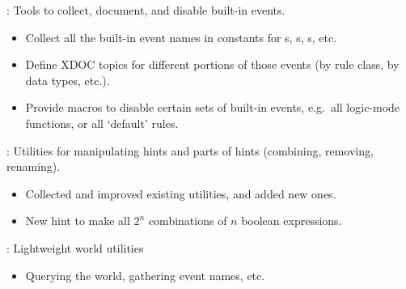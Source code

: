 
\begin{frame}

\newlibtitle

:
Tools to collect, document, and disable built-in events.
\begin{itemize}
\item Collect all the built-in event names in constants for
      s, s, s, etc.
\item Define XDOC topics for different portions of those events
      (by rule class, by data types, etc.).
\item Provide macros to disable certain sets of built-in events,
      e.g.\ all logic-mode functions, or all `default' rules.
\end{itemize}

\end{frame}


\begin{frame}

\newlibtitle

:
Utilities for manipulating hints and parts of hints (combining, removing, renaming).
\begin{itemize}
\item Collected and improved existing utilities, and added new ones.
\item New  hint to make all $2^n$ combinations of $n$ boolean expressions.
\end{itemize}

\end{frame}


\begin{frame}

\newlibtitle

:
Lightweight world utilities
\begin{itemize}
\item Querying the world, gathering event names, etc.
\end{itemize}

\end{frame}

